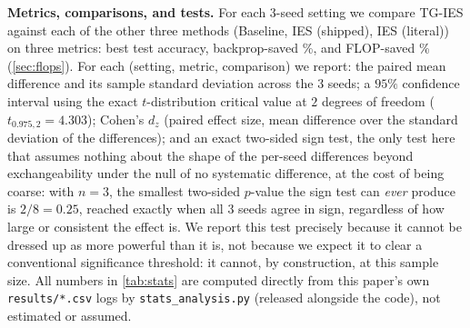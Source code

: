 \documentclass{article}
\theoremstyle{plain}
\theoremstyle{definition}
\theoremstyle{remark}
\begin{document}
\textbf{Metrics, comparisons, and tests.} For each 3-seed setting we compare TG-IES against each of the other three methods (Baseline, IES (shipped), IES (literal)) on three metrics: best test accuracy, backprop-saved \%, and FLOP-saved \% (\cref{sec:flops}). For each (setting, metric, comparison) we report: the paired mean difference and its sample standard deviation across the 3 seeds; a $95\%$ confidence interval using the exact $t$-distribution critical value at $2$ degrees of freedom ($t_{0.975,2}=4.303$); Cohen's $d_z$ (paired effect size, mean difference over the standard deviation of the differences); and an exact two-sided sign test, the only test here that assumes nothing about the shape of the per-seed differences beyond exchangeability under the null of no systematic difference, at the cost of being coarse: with $n=3$, the smallest two-sided $p$-value the sign test can \emph{ever} produce is $2/8=0.25$, reached exactly when all 3 seeds agree in sign, regardless of how large or consistent the effect is. We report this test precisely because it cannot be dressed up as more powerful than it is, not because we expect it to clear a conventional significance threshold: it cannot, by construction, at this sample size. All numbers in \cref{tab:stats} are computed directly from this paper's own \texttt{results/*.csv} logs by \texttt{stats\_analysis.py} (released alongside the code), not estimated or assumed.
\end{document}
